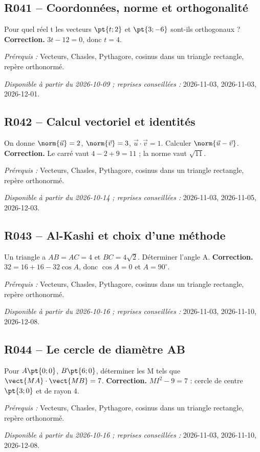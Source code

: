 \subsection*{R041 -- Coordonnées, norme et orthogonalité}\label{R041}
Pour quel réel t les vecteurs $\pt{t;2}$ et $\pt{3;-6}$ sont-ils orthogonaux ?
\ifmxteacher\textbf{Correction.} $3t-12=0$, donc $t=4$.\par\textit{Prérequis :} Vecteurs, Chasles, Pythagore, cosinus dans un triangle rectangle, repère orthonormé.\par\textit{Disponible à partir du 2026-10-09 ; reprises conseillées :} 2026-11-03, 2026-11-03, 2026-12-01.\fi
{}\subsection*{R042 -- Calcul vectoriel et identités}\label{R042}
On donne $\norm{\vec u}=2$, $\norm{\vec v}=3$, $\vec u\cdot\vec v=1$. Calculer $\norm{\vec u-\vec v}$.
\ifmxteacher\textbf{Correction.} Le carré vaut $4-2+9=11$ ; la norme vaut $\sqrt{11}$.\par\textit{Prérequis :} Vecteurs, Chasles, Pythagore, cosinus dans un triangle rectangle, repère orthonormé.\par\textit{Disponible à partir du 2026-10-14 ; reprises conseillées :} 2026-11-03, 2026-11-05, 2026-12-03.\fi
{}\subsection*{R043 -- Al-Kashi et choix d’une méthode}\label{R043}
Un triangle a $AB=AC=4$ et $BC=4\sqrt2$. Déterminer l’angle A.
\ifmxteacher\textbf{Correction.} $32=16+16-32\cos A$, donc $\cos A=0$ et $A=90^\circ$.\par\textit{Prérequis :} Vecteurs, Chasles, Pythagore, cosinus dans un triangle rectangle, repère orthonormé.\par\textit{Disponible à partir du 2026-10-16 ; reprises conseillées :} 2026-11-03, 2026-11-10, 2026-12-08.\fi
{}\subsection*{R044 -- Le cercle de diamètre AB}\label{R044}
Pour $A\pt{0;0}$, $B\pt{6;0}$, déterminer les M tels que $\vect{MA}\cdot\vect{MB}=7$.
\ifmxteacher\textbf{Correction.} $MI^2-9=7$ : cercle de centre $\pt{3;0}$ et de rayon 4.\par\textit{Prérequis :} Vecteurs, Chasles, Pythagore, cosinus dans un triangle rectangle, repère orthonormé.\par\textit{Disponible à partir du 2026-10-16 ; reprises conseillées :} 2026-11-03, 2026-11-10, 2026-12-08.\fi
